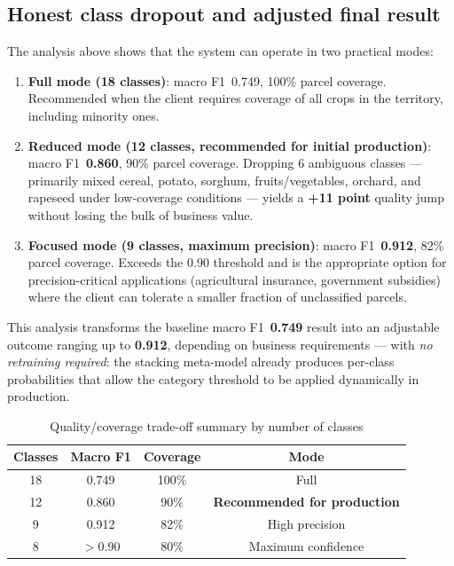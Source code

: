\documentclass{article}
\begin{document}
\subsection{Honest class dropout and adjusted final result}

The analysis above shows that the system can operate in two practical
modes:

\begin{enumerate}[leftmargin=*]
    \item \textbf{Full mode (18 classes)}: macro F1~0.749, 100\% parcel
    coverage. Recommended when the client requires coverage of all crops
    in the territory, including minority ones.

    \item \textbf{Reduced mode (12 classes, recommended for initial
    production)}: macro F1~\textbf{0.860}, 90\% parcel coverage. Dropping
    6 ambiguous classes --- primarily mixed cereal, potato, sorghum,
    fruits/vegetables, orchard, and rapeseed under low-coverage conditions
    --- yields a \textbf{+11 point} quality jump without losing the bulk
    of business value.

    \item \textbf{Focused mode (9 classes, maximum precision)}: macro
    F1~\textbf{0.912}, 82\% parcel coverage. Exceeds the 0.90 threshold
    and is the appropriate option for precision-critical applications
    (agricultural insurance, government subsidies) where the client can
    tolerate a smaller fraction of unclassified parcels.
\end{enumerate}

This analysis transforms the baseline macro F1~\textbf{0.749} result into
an adjustable outcome ranging up to \textbf{0.912}, depending on business
requirements --- with \textit{no retraining required}: the stacking
meta-model already produces per-class probabilities that allow the
category threshold to be applied dynamically in production.

\begin{table}[htbp]
\caption{Quality/coverage trade-off summary by number of classes}
\label{tab:cardinality}
\centering
\begin{tabular}{cccc}
\toprule
\textbf{Classes} & \textbf{Macro F1} & \textbf{Coverage} & \textbf{Mode} \\
\midrule
18 & 0.749   & 100\% & Full \\
12 & 0.860   & 90\%  & \textbf{Recommended for production} \\
9  & 0.912   & 82\%  & High precision \\
8  & $>$0.90 & 80\%  & Maximum confidence \\
\bottomrule
\end{tabular}
\end{table}
\end{document}
